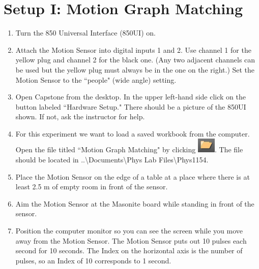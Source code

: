 \documentclass[main.tex]{subfiles}
\begin{document}
\section{Setup I: Motion Graph Matching}
\begin{enumerate}
\item
Turn the 850 Universal Interface (850UI) on.
\item
Attach the Motion Sensor into digital inputs 1 and 2. Use channel 1 for the yellow plug and channel 2 for the black one. (Any two adjacent channels can be used but the yellow plug must always be in the one on the right.) Set the Motion Sensor to the ``people" (wide angle) setting.
\item
Open Capstone from the desktop. In the upper left-hand side click on the button labeled ``Hardware Setup."  There should be a picture of the 850UI shown. If not, ask the instructor for help.
\item
For this experiment we want to load a saved workbook from the computer. Open the file titled ``Motion Graph Matching" by clicking \includegraphics{Open_Experiment}. The file should be located in ..\textbackslash Documents\textbackslash Phys Lab Files\textbackslash Phys1154.
\item
Place the Motion Sensor on the edge of a table at a place where there is at least 2.5 m of empty room in front of the sensor.
\item
Aim the Motion Sensor at the Masonite board while standing in front of the sensor.
\item
Position the computer monitor so you can see the screen while you move away from the Motion Sensor.  The Motion Sensor puts out 10 pulses each second for 10 seconds.  The Index on the horizontal axis is the number of pulses, so an Index of 10 corresponds to 1 second.
\end{enumerate}
\end{document}
